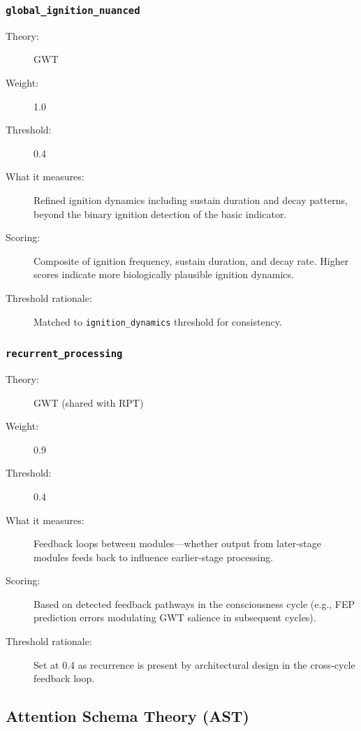 \subsubsection{\texttt{global\_ignition\_nuanced}}
\begin{description}
  \item[Theory:] GWT
  \item[Weight:] 1.0
  \item[Threshold:] 0.4
  \item[What it measures:] Refined ignition dynamics including sustain duration and decay patterns, beyond the binary ignition detection of the basic indicator.
  \item[Scoring:] Composite of ignition frequency, sustain duration, and decay rate. Higher scores indicate more biologically plausible ignition dynamics.
  \item[Threshold rationale:] Matched to \texttt{ignition\_dynamics} threshold for consistency.
\end{description}

\subsubsection{\texttt{recurrent\_processing}}
\begin{description}
  \item[Theory:] GWT (shared with RPT)
  \item[Weight:] 0.9
  \item[Threshold:] 0.4
  \item[What it measures:] Feedback loops between modules---whether output from later-stage modules feeds back to influence earlier-stage processing.
  \item[Scoring:] Based on detected feedback pathways in the consciousness cycle (e.g., FEP prediction errors modulating GWT salience in subsequent cycles).
  \item[Threshold rationale:] Set at 0.4 as recurrence is present by architectural design in the cross-cycle feedback loop.
\end{description}

\subsection{Attention Schema Theory (AST)}

